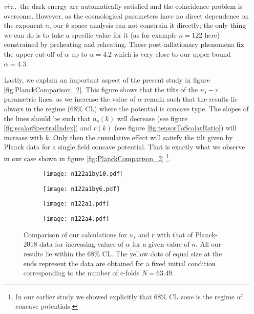 \documentclass[a4paper,11pt]{article}
\begin{document}
$viz.,$ the dark energy are automatically satisfied and the coincidence problem is overcome. However, as the cosmological parameters have no direct dependence on the exponent $n$, our $k$ space analysis can not constrain it directly; the only thing we can do is to take a specific value for it (as for example $n=122$ here) constrained by preheating and reheating. These post-inflationary phenomena fix the upper cut-off of $\alpha$ up to $\alpha=4.2$ which is very close to our upper bound $\alpha=4.3$. \par Lastly, we explain an important aspect of the present study in figure \ref{fig:PlanckComparison_2}. This figure shows that the tilts of the $n_s - r$ parametric lines, as we increase the value of $\alpha$ remain such that the results lie always in the regime ($68\%$ CL) where the potential is concave type. The slopes of the lines should be such that $n_s(k)$ will decrease (see figure \ref{fig:scalarSpectralIndex}) and $r(k)$ (see figure \ref{fig:tensorToScalarRatio}) will increase with $k$. Only then the cumulative effect will satisfy the tilt given by Planck data for a single field concave potential. That is exactly what we observe in our case shown in figure \ref{fig:PlanckComparison_2} \footnote{In our earlier study \cite{Sarkar:2021ird} we showed explicitly that $68\%$ CL zone is the regime of concave potentials.}.
\begin{figure}[H]
\begin{subfigure}{0.5\textwidth}
  \centering
   \texttt{[image: n122a1by10.pdf]} 
   \label{fig:PL_1}
\end{subfigure}%
\begin{subfigure}{0.5\textwidth}
  \centering
   \texttt{[image: n122a1by6.pdf]}
   \label{fig:PL_2}
\end{subfigure}%

\begin{subfigure}{0.5\textwidth}
  \centering
   \texttt{[image: n122a1.pdf]}
    \label{fig:PL_3}
\end{subfigure}%
\begin{subfigure}{0.5\textwidth}
  \centering
   \texttt{[image: n122a4.pdf]}
    \label{fig:PL_4}
\end{subfigure}
\caption{Comparison of our calculations for $n_s$ and $r$ with that of Planck-2018 data for increasing values of $\alpha$ for a given value of $n$. All our results lie within the $68\%$ CL. The yellow dots of equal size at the ends represent the data are obtained for a fixed initial condition corresponding to the number of e-folds $N=63.49$.}
\label{fig:PlanckComparison_1}
\end{figure}
\end{document}
